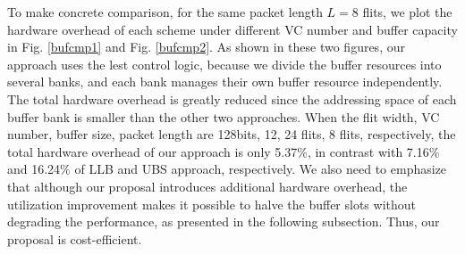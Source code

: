 \documentclass[10pt,conference]{IEEEtran}
\begin{document}
To make concrete comparison, for the same packet length $L=8$ flits, we plot the hardware overhead of each scheme under different VC number and buffer capacity in Fig. \ref{bufcmp1} and Fig. \ref{bufcmp2}. As shown in these two figures, our approach uses the lest control logic, because we divide the buffer resources into several banks, and each bank manages their own buffer resource independently. The total hardware overhead is greatly reduced since the addressing space of each buffer bank is smaller than the other two approaches. When the flit width, VC number, buffer size, packet length are 128bits, 12, 24 flits, 8 flits, respectively, the total hardware overhead of our approach is only 5.37\%, in contrast with 7.16\% and 16.24\% of LLB and UBS approach, respectively. We also need to emphasize that although our proposal introduces additional hardware overhead, the utilization improvement makes it possible to halve the buffer slots without degrading the performance, as presented in the following subsection. Thus, our proposal is cost-efficient.

\end{document}
